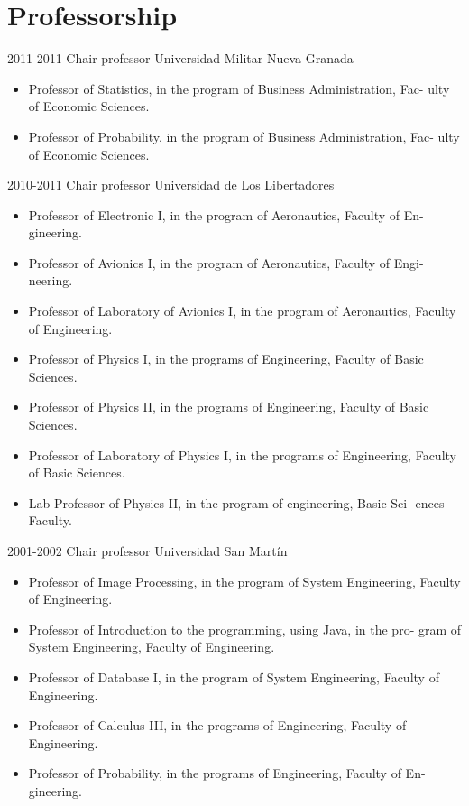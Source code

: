 \section{Professorship}

\begin{entrylist}
  \entry
	{2011-2011}
	{Chair professor}
	{Universidad Militar Nueva Granada}
	{\begin{itemize}
	    \item Professor of Statistics, in the program of Business Administration, Fac-
ulty of Economic Sciences.
            \item Professor of Probability, in the program of Business Administration, Fac-
	ulty of Economic Sciences.
	\end{itemize}}
  \entry
	{2010-2011}
	{Chair professor}
	{Universidad de Los Libertadores}
	{\begin{itemize}
              \item Professor of Electronic I, in the program of Aeronautics, Faculty of En-
gineering.
              \item Professor of Avionics I, in the program of Aeronautics, Faculty of Engi-
neering.
              \item Professor of Laboratory of Avionics I, in the program of Aeronautics,
Faculty of Engineering.
              \item Professor of Physics I, in the programs of Engineering, Faculty of Basic
Sciences.
              \item Professor of Physics II, in the programs of Engineering, Faculty of Basic
Sciences.
              \item Professor of Laboratory of Physics I, in the programs of Engineering,
Faculty of Basic Sciences.
              \item Lab Professor of Physics II, in the program of engineering, Basic Sci-
ences Faculty.
	\end{itemize}}

  \entry
        {2001-2002}
	{Chair professor}
	{Universidad San Martín}
	{\begin{itemize}
              \item Professor of Image Processing, in the program of System Engineering,
Faculty of Engineering.
              \item Professor of Introduction to the programming, using Java, in the pro-
gram of System Engineering, Faculty of Engineering.
              \item Professor of Database I, in the program of System Engineering, Faculty
of Engineering.
              \item Professor of Calculus III, in the programs of Engineering, Faculty of
Engineering.
              \item Professor of Probability, in the programs of Engineering, Faculty of En-
gineering.
	\end{itemize}}


\end{entrylist}
